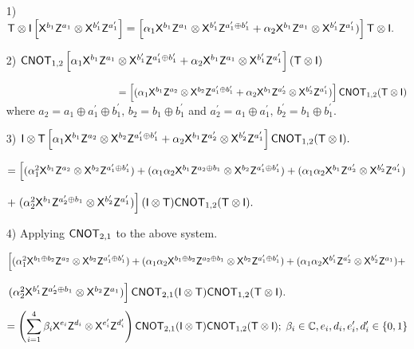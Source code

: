  \begin{enumerate}
\item[1)]  ${\sf T}\otimes {\sf I} \left[{\sf X}^{b_1}{\sf Z}^{a_1}\otimes {\sf X}^{b_1^\prime}{\sf Z}^{a_1^\prime}\right]=\left[\alpha_1 {\sf X}^{b_1}{\sf Z}^{a_1} \otimes {\sf X}^{b_1^\prime}{\sf Z}^{a_1^\prime \oplus b_1^\prime} + \alpha_2 {\sf X}^{b_1}{\sf Z}^{a_1} \otimes {\sf X}^{b_1^\prime}{\sf Z}^{a_1^\prime})\right]{\sf T}\otimes {\sf I}.$
\item[2)] ${\sf CNOT}_{1,2}\left[\alpha_1 {\sf X}^{b_1}{\sf Z}^{a_1} \otimes {\sf X}^{b_1^\prime}{\sf Z}^{a_1^\prime \oplus b_1^\prime} + \alpha_2 {\sf X}^{b_1}{\sf Z}^{a_1} \otimes {\sf X}^{b_1^\prime}{\sf Z}^{a_1^\prime}\right] ({\sf T}\otimes {\sf I})$

$\hspace{3.9cm}=\left[(\alpha_1 \xgate^{b_1}\zgate^{a_2} \otimes \xgate^{b_2}\zgate^{a_1^\prime \oplus b_1^\prime} + \alpha_2 \xgate^{b_1}\zgate^{a_2^\prime} \otimes \xgate^{b_2^\prime}\zgate^{a_1^\prime})\right]\cnot_{1,2}(\tgate\otimes \igate)$\\
where $a_2=a_1 \oplus a_1^\prime \oplus b_1^\prime,\, b_2=b_1 \oplus b_1^\prime$  and  $a_2^\prime=a_1 \oplus a_1^\prime,\, b_2^\prime=b_1 \oplus b_1^\prime.$ 
\item[3)] ${\sf I}\otimes {\sf T} \left[\alpha_1 {\sf X}^{b_1}{\sf Z}^{a_2} \otimes {\sf X}^{b_2}{\sf Z}^{a_1^\prime \oplus b_1^\prime} + \alpha_2 {\sf X}^{b_1}{\sf Z}^{a_2^\prime} \otimes {\sf X}^{b_2^\prime}{\sf Z}^{a_1^\prime}\right]{\sf CNOT}_{1,2}({\sf T}\otimes {\sf I}).$

$=\left[(\alpha_1^2 {\sf X}^{b_1}{\sf Z}^{a_2} \otimes {\sf X}^{b_2}{\sf Z}^{a_1^\prime \oplus b_1^\prime})+(\alpha_1\alpha_2 {\sf X}^{b_1}{\sf Z}^{a_2\oplus b_1} \otimes {\sf X}^{b_2}{\sf Z}^{a_1^\prime \oplus b_1^\prime})+ (\alpha_1\alpha_2 {\sf X}^{b_1}{\sf Z}^{a_2^\prime} \otimes {\sf X}^{b_2^\prime}{\sf Z}^{a_1^\prime})\right.$

$+ \left.(\alpha_2^2 {\sf X}^{b_1}{\sf Z}^{a_2^\prime \oplus b_1} \otimes {\sf X}^{b_2^\prime}{\sf Z}^{a_1^\prime})\right] ({\sf I}\otimes {\sf T}){\sf CNOT}_{1,2}({\sf T}\otimes {\sf I}).$
\item[4)] Applying ${\sf CNOT}_{2,1}$ to the above system.

$\left[(\alpha_1^2 {\sf X}^{b_1\oplus b_2}{\sf Z}^{a_2} \otimes {\sf X}^{b_2}{\sf Z}^{a_1^\prime \oplus b_1^\prime})+(\alpha_1\alpha_2 {\sf X}^{b_1\oplus b_2}{\sf Z}^{a_2\oplus b_1} \otimes {\sf X}^{b_2}{\sf Z}^{a_1^\prime \oplus b_1^\prime})+ (\alpha_1\alpha_2 {\sf X}^{b_1^\prime}{\sf Z}^{a_2^\prime} \otimes {\sf X}^{b_2^\prime}{\sf Z}^{a_1})+\right.$

$\left.(\alpha_2^2 {\sf X}^{b_1^\prime}{\sf Z}^{a_2^\prime \oplus b_1} \otimes {\sf X}^{b_2}{\sf Z}^{a_1})\right] {\sf CNOT}_{2,1}({\sf I}\otimes {\sf T}){\sf CNOT}_{1,2}({\sf T}\otimes {\sf I}).$
$$=\left(\sum_{i=1}^{4} \beta_i {\sf X}^{e_i}{\sf Z}^{d_i}\otimes {\sf X}^{e_i^\prime}{\sf Z}^{d_i^\prime}\right){\sf CNOT}_{2,1}({\sf I}\otimes {\sf T}){\sf CNOT}_{1,2}({\sf T}\otimes {\sf I});\; \beta_i\in \mathbb{C}, e_i,d_i,e_i^\prime,d_i^\prime \in\{0,1\}$$
\end{enumerate}

